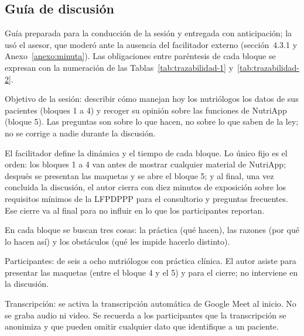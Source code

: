\documentclass[12pt, a4paper]{article}
\begin{document}
\subsection{Guía de discusión}
\label{anexo:guia}
 
Guía preparada para la conducción de la sesión y entregada con anticipación; la usó el asesor, que moderó ante la ausencia del facilitador externo (sección~4.3.1 y Anexo~\ref{anexo:minuta}). Las obligaciones entre paréntesis de cada bloque se expresan con la numeración de las Tablas~\ref{tab:trazabilidad-1} y~\ref{tab:trazabilidad-2}.
 
Objetivo de la sesión: describir cómo manejan hoy los nutriólogos los datos de sus pacientes (bloques 1 a 4) y recoger su opinión sobre las funciones de NutriApp (bloque 5). Las preguntas son sobre lo que hacen, no sobre lo que saben de la ley; no se corrige a nadie durante la discusión.
 
El facilitador define la dinámica y el tiempo de cada bloque. Lo único fijo es el orden: los bloques 1 a 4 van antes de mostrar cualquier material de NutriApp; después se presentan las maquetas y se abre el bloque 5; y al final, una vez concluida la discusión, el autor cierra con diez minutos de exposición sobre los requisitos mínimos de la LFPDPPP para el consultorio y preguntas frecuentes. Ese cierre va al final para no influir en lo que los participantes reportan.
 
En cada bloque se buscan tres cosas: la práctica (qué hacen), las razones (por qué lo hacen así) y los obstáculos (qué les impide hacerlo distinto).
 
Participantes: de seis a ocho nutriólogos con práctica clínica. El autor asiste para presentar las maquetas (entre el bloque 4 y el 5) y para el cierre; no interviene en la discusión.
 
Transcripción: se activa la transcripción automática de Google Meet al inicio. No se graba audio ni video. Se recuerda a los participantes que la transcripción se anonimiza y que pueden omitir cualquier dato que identifique a un paciente.
 
\end{document}
